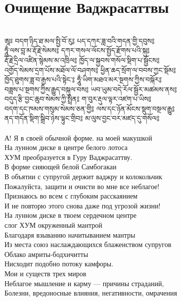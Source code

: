 \section{Очищение Ваджрасаттвы}
\\
\ti
ཨཱཿ བདག་ཉིད་ཐ་མལ་སྤྱི་བོ་རུ༔ པད་དཀར་ཟླ་བའི་གདན་གྱི་དབུས༔ \\
ཧཱུྂ་ལས་བླ་མ་རྡོ་རྗེ་སེམས༔ དཀར་གསལ་ལོངས་སྤྱོད་རྫོགས་པའི་སྐུ༔\\
རྡོ་རྗེ་དྲིལ་འཛིན་སྙེམས་མ་འཁྲིལ༔ ཁྱོད་ལ་སྐྱབས་གསོལ་སྡིག་པ་སྦྱོངས༔ \\
འགྱོད་སེམས་དྲག་པོས་མཐོལ་ལོ་བཤགས༔ ཕྱིན་ཆད་སྲོག་ལ་བབས་ཀྱང་སྡོམ༔ \\
ཁྱོད་ཐུགས་ཟླ་བ་རྒྱས་པའི་སྟེང་༔ ཧཱུྂ་ཡིག་མཐའ་མར་སྔགས་ཀྱིས་བསྐོར༔ \\
བཟླས་པ་སྔགས་ཀྱིས་རྒྱུད་བསྐུལ་བས༔ ཡབ་ཡུམ་བདེ་རོལ་སྦྱོར་མཚམས་ནས༔ \\
བདུད་རྩི་བྱང་ཆུབ་སེམས་ཀྱི་སྤྲིན༔ ག་བུར་རྡུལ་ལྟར་འཛག་པ་ཡིས༔ \\
བདག་དང་ཁམས་གསུམ་སེམས་ཅན་གྱི༔ ལས་དང་ཉོན་མོངས་སྡུག་བསྔལ་རྒྱུ༔ \\
ནད་གདོན་སྡིག་སྒྲིབ་ཉེས་ལྟུང་གྲིབ༔ མ་ལུས་བྱང་བར་མཛད་དུ་གསོལ༔\\
\\
\ru
А! Я в своей обычной форме. на моей макушкой\\
На лунном диске в центре белого лотоса\\
ХУМ преобразуется в Гуру Ваджрасаттву.\\
В форме сияющей белой Самбогакаи\\
В объятии с супругой держит ваджру и колокольчик\\
Пожалуйста, защити и очисти во мне все неблагое!\\
Признаюсь во всем с глубоким расскаянием\\
И не повторю этого снова даже под угрозой жизни!\\
На лунном диске в твоем сердечном центре\\
слог ХУМ окруженный мантрой\\
Благодаря взыванию начитыванием мантры\\
Из места союз наслаждающихся блаженством супругов\\
Облако амриты-бодхичитты\\
Нисходит подобно потоку камфоры.\\
Мои и существ трех миров\\
Неблагое мышление и карму — причины страданий,\\
Болезни, вредоносные влияния, негативности, омрачения\\
